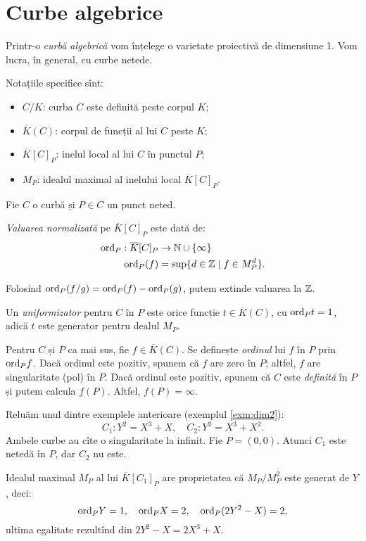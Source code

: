 \chapter{Curbe algebrice}

Printr-o \emph{curbă algebrică} vom înțelege o varietate proiectivă de
dimensiune 1. Vom lucra, în general, cu curbe netede.

Notațiile specifice sînt:
\begin{itemize}
\item $ C/K $: curba $ C $ este definită peste corpul $ K $;
\item $ \overline{K}(C) $: corpul de funcții al lui $ C $ peste $ K $;
\item $ \overline{K}[C]_P $: inelul local al lui $ C $ în punctul $ P $;
\item $ M_P $: idealul maximal al inelului local $ \overline{K}[C]_P $.
\end{itemize}

\begin{definition}\label{def:valuare-norm}
  Fie $ C $ o curbă și $ P \in C $ un punct neted.

  \emph{Valuarea normalizată} pe $ \overline{K}[C]_P $ este dată de:
  \begin{align*}
    \mathrm{ord}_P : \overline{K}[C]_P &\to \mathbb{N} \cup \{ \infty \} \\
    \mathrm{ord}_P(f) &= \sup \{ d \in \mathbb{Z} \mid f \in M_P^d \}.
  \end{align*}

  Folosind $ \mathrm{ord}_P(f/g) = \mathrm{ord}_P(f) - \mathrm{ord}_P(g) $, putem
  extinde valuarea la $ \mathbb{Z} $.

  Un \emph{uniformizator} pentru $ C $ în $ P $ este orice funcție
  $ t \in \overline{K}(C) $, cu $ \mathrm{ord}_P t = 1 $, adică
  $ t $ este generator pentru dealul $ M_P $.
\end{definition}

Pentru $ C $ și $ P $ ca mai sus, fie $ f \in \overline{K}(C) $.
Se definește \emph{ordinul} lui $ f $ în $ P $ prin $ \mathrm{ord}_P f $.
Dacă ordinul este pozitiv, spunem că $ f $ are zero în $ P $; altfel,
$ f $ are singularitate (pol) în $ P $. Dacă ordinul este pozitiv,
spunem că $ C $ este \emph{definită} în $ P $ și putem calcula $ f(P) $.
Altfel, $ f(P) = \infty $.

\begin{example}\label{exm:ordin}
  Reluăm unul dintre exemplele anterioare (exemplul \ref{exm:dim2}):
  \[
    C_1: Y^2 = X^3 + X, \quad C_2: Y^2 = X^3 + X^2.
  \]
  Ambele curbe au cîte o singularitate la infinit. Fie $ P = (0, 0) $.
  Atunci $ C_1 $ este netedă în $ P $, dar $ C_2 $ nu este.

  Idealul maximal $ M_P $ al lui $ \overline{K}[C_1]_P $ are proprietatea că
  $ M_P/M_P^2 $ este generat de $ Y $, deci:
  \[
    \mathrm{ord}_P Y = 1, \quad \mathrm{ord}_P X = 2, \quad \mathrm{ord}_P(2Y^2 - X) = 2,
  \]
  ultima egalitate rezultînd din $ 2Y^2 - X = 2X^3 + X $.
\end{example}

